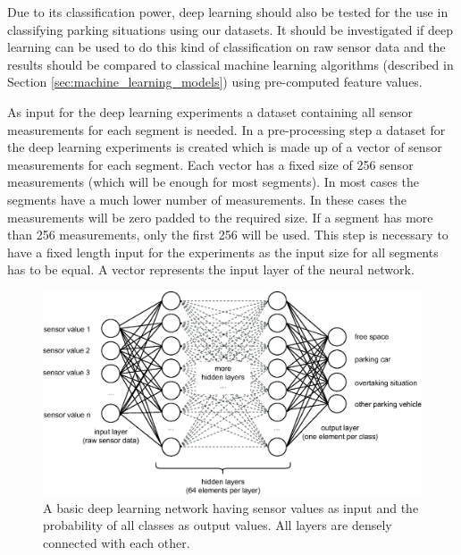 Due to its classification power, deep learning should also be tested for the use in classifying parking situations using our datasets. It should be investigated if deep learning can be used to do this kind of classification on raw sensor data and the results should be compared to classical machine learning algorithms (described in Section \ref{sec:machine_learning_models}) using pre-computed feature values.


As input for the deep learning experiments a dataset containing all sensor measurements for each segment is needed. In a pre-processing step a dataset for the deep learning experiments is created which is made up of a vector of sensor measurements for each segment. Each vector has a fixed size of 256 sensor measurements (which will be enough for most segments). In most cases the segments have a much lower number of measurements. In these cases the measurements will be zero padded to the required size. If a segment has more than 256 measurements, only the first 256 will be used. This step is necessary to have a fixed length input for the experiments as the input size for all segments has to be equal. A vector represents the input layer of the neural network. 

\begin{figure}
	\centering
	\includegraphics[width=\textwidth]{img/deep_learning_basic_model_2.eps}
	\caption{A basic deep learning network having sensor values as input and the probability of all classes as output values. All layers are densely connected with each other.}
	\label{fig:densely_dl_network}
\end{figure}





